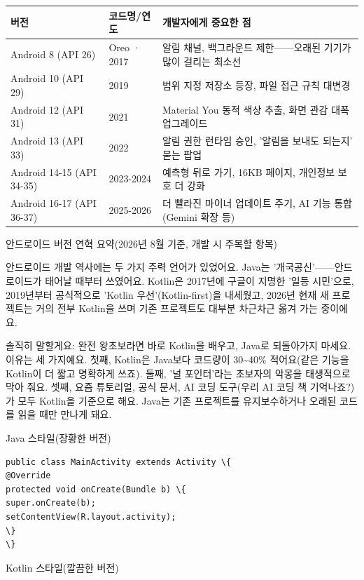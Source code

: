 \begin{center}
\begin{tabularx}{\linewidth}{|X|X|X|}
\hline
\textbf{버전} & \textbf{코드명/연도} & \textbf{개발자에게 중요한 점} \tabularnewline
\hline
Android 8 (API 26) & Oreo · 2017 & 알림 채널, 백그라운드 제한——오래된 기기가 많이 걸리는 최소선 \tabularnewline
Android 10 (API 29) & 2019 & 범위 지정 저장소 등장, 파일 접근 규칙 대변경 \tabularnewline
Android 12 (API 31) & 2021 & Material You 동적 색상 추출, 화면 관감 대폭 업그레이드 \tabularnewline
Android 13 (API 33) & 2022 & 알림 권한 런타임 승인, '알림을 보내도 되는지' 묻는 팝업 \tabularnewline
Android 14-15 (API 34-35) & 2023-2024 & 예측형 뒤로 가기, 16KB 페이지, 개인정보 보호 더 강화 \tabularnewline
Android 16-17 (API 36-37) & 2025-2026 & 더 빨라진 마이너 업데이트 주기, AI 기능 통합(Gemini 확장 등) \tabularnewline
\hline
\end{tabularx}
\end{center}

\begin{center}\small\color{gray}안드로이드 버전 연혁 요약(2026년 8월 기준, 개발 시 주목할 항목)\end{center}


안드로이드 개발 역사에는 두 가지 주력 언어가 있었어요. Java는 '개국공신'——안드로이드가 태어날 때부터 쓰였어요. Kotlin은 2017년에 구글이 지명한 '일등 시민'으로, 2019년부터 공식적으로 'Kotlin 우선'(Kotlin-first)을 내세웠고, 2026년 현재 새 프로젝트는 거의 전부 Kotlin을 쓰며 기존 프로젝트도 대부분 차근차근 옮겨 가는 중이에요.

솔직히 말할게요: 완전 왕초보라면 바로 Kotlin을 배우고, Java로 되돌아가지 마세요. 이유는 세 가지예요. 첫째, Kotlin은 Java보다 코드량이 30\textasciitilde{}40\% 적어요(같은 기능을 Kotlin이 더 짧고 명확하게 쓰죠). 둘째, '널 포인터'라는 초보자의 악몽을 태생적으로 막아 줘요. 셋째, 요즘 튜토리얼, 공식 문서, AI 코딩 도구(우리 AI 코딩 책 기억나죠?)가 모두 Kotlin을 기준으로 해요. Java는 기존 프로젝트를 유지보수하거나 오래된 코드를 읽을 때만 만나게 돼요.

Java 스타일(장황한 버전)

\begin{lstlisting}
public class MainActivity extends Activity \{
@Override
protected void onCreate(Bundle b) \{
super.onCreate(b);
setContentView(R.layout.activity);
\}
\}
\end{lstlisting}

Kotlin 스타일(깔끔한 버전)

